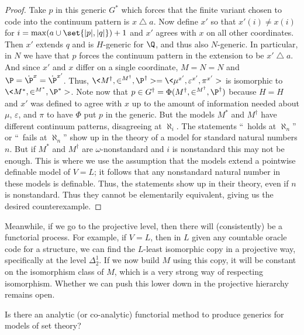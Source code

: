 \documentclass{amsart}
\begin{document}
\begin{proof}
Take $p$ in this generic $G^*$ which forces that the finite variant chosen to code into the continuum pattern is $x \mathbin{\triangle} a$.
Now define $x'$ so that $x'(i) \ne x(i)$ for $i = \max(a \cup \set{\lvert p \rvert, \lvert q \rvert})+1$ and $x'$ agrees with $x$ on all other coordinates. Then $x'$ extends $q$ and is $H$-generic for $\Q$, and thus also $N$-generic. In particular, in $N$ we have that $p$ forces the continuum pattern in the extension to be $x' \mathbin{\triangle} a$.
And since $x'$ and $x$ differ on a single coordinate, $M = N = N$ and $\P = \dot \P^x = \dot \P^{x'}$. Thus, $\<M^\dagger,\in^{M^\dagger}, \P^\dagger> = \<\mu^{x'}, \varepsilon^{x'}, \pi^{x'}>$ is isomorphic to $\<M^*,\in^{M^*},\P^*>$. Note now that $p \in G^\dagger = \Phi(M^\dagger,\in^{M^\dagger}, \P^\dagger)$ because $H = H$ and $x'$ was defined to agree with $x$ up to the amount of information needed about $\mu$, $\varepsilon$, and $\pi$ to have $\Phi$ put $p$ in the generic. But the models $M^*$ and $M^\dagger$ have different continuum patterns, disagreeing at $\aleph_i$.
The statements ``\GCH\ holds at $\aleph_n$'' or ``\GCH\ fails at $\aleph_n$'' show up in the theory of a model for standard natural numbers $n$. But if $M^*$ and $M^\dagger$ are $\omega$-nonstandard and $i$ is nonstandard this may not be enough. This is where we use the assumption that the models extend a pointwise definable model of $V=L$; it follows that any nonstandard natural number in these models is definable. Thus, the statements show up in their theory, even if $n$ is nonstandard. Thus they cannot be elementarily equivalent, giving us the desired counterexample.
\end{proof}
Meanwhile, if we go to the projective level, then there will (consistently) be a functorial process. For example, if $V=L$, then in $L$ given any countable oracle code for a structure, we can find the $L$-least isomorphic copy in a projective way, specifically at the level $\Delta^1_2$. If we now build $M$ using this copy, it will be constant on the isomorphism class of $M$, which is a very strong way of respecting isomorphism. Whether we can push this lower down in the projective hierarchy remains open.
\begin{question}
Is there an analytic (or co-analytic) functorial method to produce generics for models of set theory?
\end{question}


\end{document}
